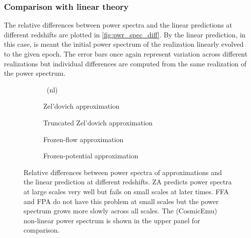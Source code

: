 \subsubsection{Comparison with linear theory}
The relative differences between power spectra and the linear predictions at different redshifts are plotted in \autoref{fig:pwr_spec_diff}. By the linear prediction, in this case, is meant the initial power spectrum of the realization linearly evolved to the given epoch. The error bars once again represent variation across different realizations but individual differences are computed from the same realization of the power spectrum.
\begin{figure*}[!hbt]
	\begin{adjustwidth}{-1cm}{-1cm}
	\centering
		\begin{subfigure}{1.0\linewidth}
		\end{subfigure}
		\begin{subfigure}{0.5\linewidth}
			\caption{\LCDM\ (nl)}	
		\end{subfigure}
		\begin{subfigure}{0.5\linewidth}
			\caption{Zel'dovich approximation}
		\end{subfigure}%
		\begin{subfigure}{0.5\linewidth}
			\caption{Truncated Zel'dovich approximation}
		\end{subfigure}
		\begin{subfigure}{0.5\linewidth}
			\caption{Frozen-flow approximation}
		\end{subfigure}%
		\begin{subfigure}{0.5\linewidth}
			\caption{Frozen-potential approximation}
		\end{subfigure}
	\end{adjustwidth}
	\caption{Relative differences between power spectra of approximations and the linear prediction at different redshifts. ZA predicts power spectra at large scales very well but fails on small scales at later times. FFA and FPA do not have this problem at small scales but the power spectrum grows more slowly across all scales. The (CosmicEmu) non-linear power spectrum is shown in the upper panel for comparison.}
	\label{fig:pwr_spec_diff}
\end{figure*}

